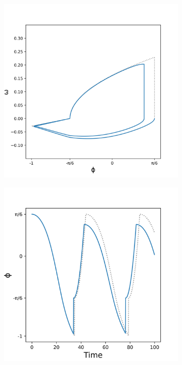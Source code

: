 \documentclass{article}
\begin{document}
\begin{figure}[htbp]
  \centering
  \begin{subfigure}[b]{0.5\textwidth}
    \vspace{0pt} %
    \centering
    \includegraphics[width=\textwidth]{../plots/trajectory2_233_22.png}
    \caption{}
    \label{fig:DuckPlot2Fair}
  \end{subfigure}%
  \hspace{-15pt}%
  \begin{subfigure}[b]{0.5\textwidth}
    \vspace{0pt} %
    \centering
    \includegraphics[width=\textwidth]{../plots/angleTime2_233_22.png}

\end{subfigure}
\end{figure}
\end{document}
